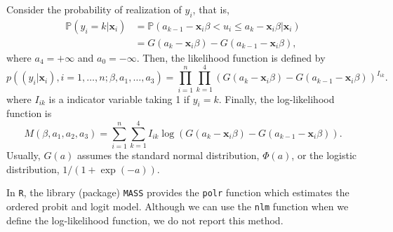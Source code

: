 \documentclass[
  12pt,
]{article}
\newenvironment{Shaded}{\begin{snugshade}}{\end{snugshade}}
\newcommand{\DataTypeTok}[1]{\textcolor[rgb]{0.13,0.29,0.53}{#1}}
\newcommand{\DecValTok}[1]{\textcolor[rgb]{0.00,0.00,0.81}{#1}}
\newcommand{\KeywordTok}[1]{\textcolor[rgb]{0.13,0.29,0.53}{\textbf{#1}}}
\newcommand{\NormalTok}[1]{#1}
\newcommand{\OperatorTok}[1]{\textcolor[rgb]{0.81,0.36,0.00}{\textbf{#1}}}
\newcommand{\StringTok}[1]{\textcolor[rgb]{0.31,0.60,0.02}{#1}}
\begin{document}
Consider the probability of realization of \(y_i\), that is,
\begin{equation*}
  \begin{split}
  \mathbb{P}(y_i = k | \mathbf{x}_i) 
  &= \mathbb{P}(a_{k-1} - \mathbf{x}_i \beta < u_i \le a_k - \mathbf{x}_i \beta | \mathbf{x}_i)  \\
  &= G(a_k - \mathbf{x}_i \beta) - G(a_{k-1} - \mathbf{x}_i \beta),
  \end{split}
\end{equation*} where \(a_{4} = +\infty\) and \(a_0 = -\infty\). Then,
the likelihood function is defined by \begin{equation*}
  p((y_i|\mathbf{x}_i), i = 1, \ldots, n; \beta, a_1, \ldots, a_3)
  = \prod_{i=1}^n \prod_{k=1}^4 (G(a_k - \mathbf{x}_i \beta) - G(a_{k-1} - \mathbf{x}_i \beta))^{I_{ik}}.
\end{equation*} where \(I_{ik}\) is a indicator variable taking 1 if
\(y_i = k\). Finally, the log-likelihood function is \begin{equation*}
  M(\beta, a_1, a_2, a_3) = \sum_{i=1}^n \sum_{k=1}^4 I_{ik} \log(G(a_k - \mathbf{x}_i \beta) - G(a_{k-1} - \mathbf{x}_i \beta)).
\end{equation*} Usually, \(G(a)\) assumes the standard normal
distribution, \(\Phi(a)\), or the logistic distribution,
\(1/(1 + \exp(-a))\).

In \texttt{R}, the library (package) \texttt{MASS} provides the
\texttt{polr} function which estimates the ordered probit and logit
model. Although we can use the \texttt{nlm} function when we define the
log-likelihood function, we do not report this method.

\begin{Shaded}
\end{Shaded}
\end{document}
